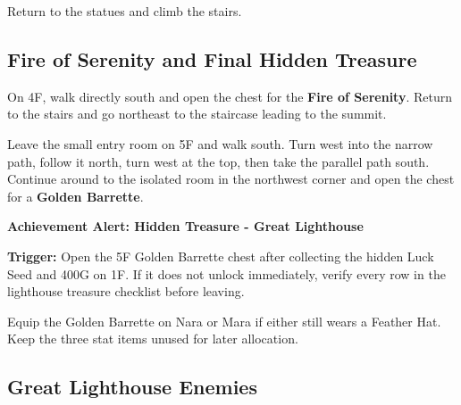 \documentclass[
  american,
  10pt,
  letterpaper,
  oneside,
  open=any]{scrreprt}
\begin{document}
Return to the statues and climb the stairs.

\subsection{Fire of Serenity and Final Hidden
Treasure}\label{fire-of-serenity-and-final-hidden-treasure}

On 4F, walk directly south and open the chest for the \textbf{Fire of
Serenity}. Return to the stairs and go northeast to the staircase
leading to the summit.

Leave the small entry room on 5F and walk south. Turn west into the
narrow path, follow it north, turn west at the top, then take the
parallel path south. Continue around to the isolated room in the
northwest corner and open the chest for a \textbf{Golden Barrette}.

\begin{achievementalert}

\textbf{Achievement Alert: Hidden Treasure - Great Lighthouse}

\textbf{Trigger:} Open the 5F Golden Barrette chest after collecting the
hidden Luck Seed and 400G on 1F. If it does not unlock immediately,
verify every row in the lighthouse treasure checklist before leaving.

\end{achievementalert}

Equip the Golden Barrette on Nara or Mara if either still wears a
Feather Hat. Keep the three stat items unused for later allocation.

\subsection{Great Lighthouse Enemies}\label{great-lighthouse-enemies}
\end{document}

